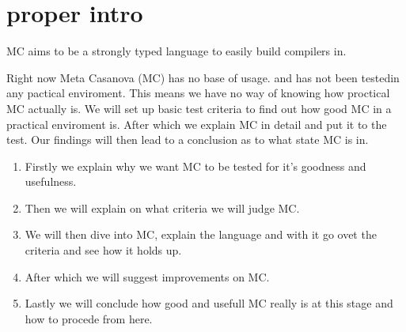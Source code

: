 \section{proper intro}

MC aims to be a strongly typed language to easily build compilers in.

Right now Meta Casanova (MC) has no base of usage. and has not been testedin any pactical enviroment. This means we have no way of knowing how proctical MC actually is. We will set up basic test criteria to find out how good MC in a practical enviroment is. After which we explain MC in detail and put it to the test. Our findings will then lead to a conclusion as to what state MC is in.

\begin{enumerate}
	\item Firstly we explain why we want MC to be tested for it's goodness and usefulness.
	\item Then we will explain on what criteria we will judge MC.
	\item We will then dive into MC, explain the language and with it go ovet the criteria and see how it holds up.
	\item After which we will suggest improvements on MC.
	\item Lastly we will conclude how good and usefull MC really is at this stage and how to procede from here.
\end{enumerate}

